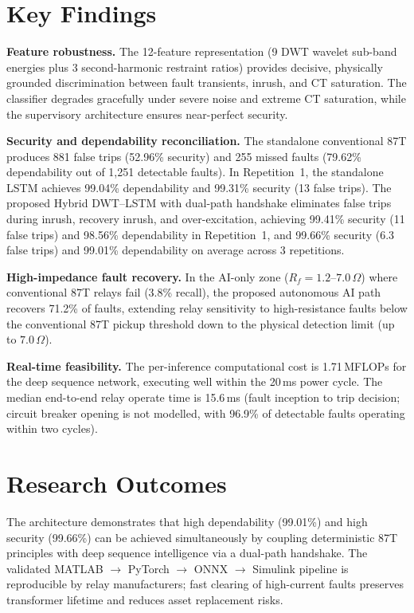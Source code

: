 \documentclass[12pt,a4paper,oneside]{report}
\begin{document}
\section{Key Findings}
\textbf{Feature robustness.} The 12-feature representation (9 DWT wavelet sub-band energies plus 3 second-harmonic restraint ratios) provides decisive, physically grounded discrimination between fault transients, inrush, and CT saturation. The classifier degrades gracefully under severe noise and extreme CT saturation, while the supervisory architecture ensures near-perfect security.

\textbf{Security and dependability reconciliation.} The standalone conventional 87T produces 881 false trips (52.96\% security) and 255 missed faults (79.62\% dependability out of 1,251 detectable faults). In Repetition~1, the standalone LSTM achieves 99.04\% dependability and 99.31\% security (13 false trips). The proposed Hybrid DWT--LSTM with dual-path handshake eliminates false trips during inrush, recovery inrush, and over-excitation, achieving 99.41\% security (11 false trips) and 98.56\% dependability in Repetition~1, and 99.66\% security (6.3 false trips) and 99.01\% dependability on average across 3 repetitions.

\textbf{High-impedance fault recovery.} In the AI-only zone ($R_f = 1.2$--$7.0\,\Omega$) where conventional 87T relays fail (3.8\% recall), the proposed autonomous AI path recovers 71.2\% of faults, extending relay sensitivity to high-resistance faults below the conventional 87T pickup threshold down to the physical detection limit (up to $7.0\,\Omega$).

\textbf{Real-time feasibility.} The per-inference computational cost is 1.71\,MFLOPs for the deep sequence network, executing well within the 20\,ms power cycle. The median end-to-end relay operate time is 15.6\,ms (fault inception to trip decision; circuit breaker opening is not modelled, with 96.9\% of detectable faults operating within two cycles).

\section{Research Outcomes}
The architecture demonstrates that high dependability (99.01\%) and high security (99.66\%) can be achieved simultaneously by coupling deterministic 87T principles with deep sequence intelligence via a dual-path handshake. The validated MATLAB $\to$ PyTorch $\to$ ONNX $\to$ Simulink pipeline is reproducible by relay manufacturers; fast clearing of high-current faults preserves transformer lifetime and reduces asset replacement risks.
\end{document}

